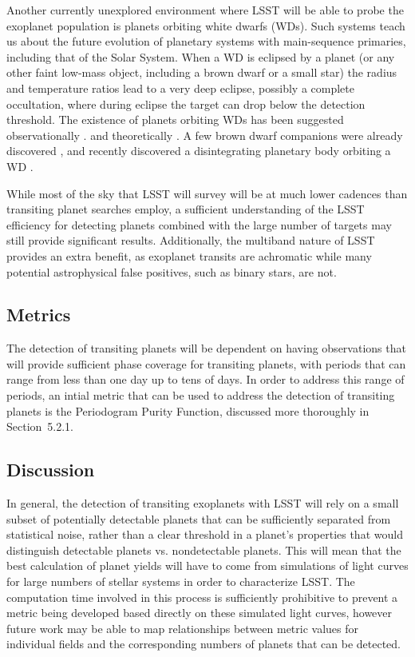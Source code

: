 Another currently unexplored environment where LSST will be able to
probe the exoplanet population is planets orbiting white dwarfs (WDs).
Such systems teach us about the future evolution of planetary systems
with main-sequence primaries, including that of the Solar System. When a
WD is eclipsed by a planet (or any other faint low-mass object,
including a brown dwarf or a small star) the radius and temperature
ratios lead to a very deep eclipse, possibly a complete occultation,
where during eclipse the target can drop below the detection threshold.
The existence of planets orbiting WDs has been suggested
observationally
\citep[e.g.,][]{2009ApJ...694..805F,2009AJ....137.3191J,2010ApJ...722..725Z,2012ApJ...747..148D}.
and theoretically \citep[e.g.,][]{2010MNRAS.408..631N}.
A few brown dwarf companions were already discovered
\citep[e.g.,][]{2006Natur.442..543M,2012ApJ...759L..34C,2006Sci...314.1578L,2014MNRAS.445.2106L},
and \citet{2015Natur.526..546V}
recently discovered a disintegrating planetary body orbiting a WD
\citep[see also][]{2015arXiv151006434C,2016ApJ...818L...7G,2016MNRAS.458.3904R}.

While most of the sky that LSST will survey will be at much lower
cadences than transiting planet searches employ, a sufficient
understanding of the LSST efficiency for detecting planets combined with
the large number of targets may still provide significant results.
Additionally, the multiband nature of LSST provides an extra benefit, as
exoplanet transits are achromatic while many potential astrophysical
false positives, such as binary stars, are not.

\subsection{Metrics}
\label{sec:\secname:metrics}
The detection of transiting planets will be dependent on having observations
that will provide sufficient phase coverage for transiting planets, with periods
that can range from less than one day up to tens of days. In order to address
this range of periods, an intial metric that can be used to address the detection
of transiting planets is the Periodogram Purity Function, discussed more thoroughly
in Section~5.2.1.

\subsection{Discussion}
\label{sec:\secname:discussion}
In general, the detection of transiting exoplanets with LSST will rely on
a small subset of potentially detectable planets that can be sufficiently
separated from statistical noise, rather than a clear threshold in a planet's
properties that would distinguish detectable planets vs. nondetectable planets.
This will mean that the best calculation of planet yields will have to come
from simulations of light curves for large numbers of stellar systems in order
to characterize LSST. The computation time involved in this process is sufficiently
prohibitive to prevent a metric being developed based directly on these
simulated light curves, however future work may be able to map relationships
between metric values for individual fields and the corresponding numbers
of planets that can be detected.

